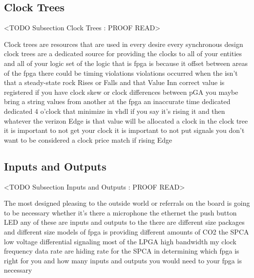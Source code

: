 \subsection{Clock Trees}
	<TODO Subsection Clock Trees : PROOF READ>

Clock trees are resources that are used in every desire every synchronous design clock trees are a dedicated source for providing the clocks to all of your entities and all of your logic set of the logic that is fpga is because it offset between areas of the fpga there could be timing violations violations occurred when the isn't that a steady-state rock Rises or Falls and that Value Inn correct value is registered if you have clock skew or clock differences between pGA you maybe bring a string values from another at the fpga an inaccurate time dedicated dedicated 4 o'clock that minimize in vhdl if you say it's rising it and then whatever the verizon Edge is that value will be allocated a clock in the clock tree it is important to not get your clock it is important to not put signals you don't want to be considered a clock price match if rising Edge

\subsection{Inputs and Outputs}
	<TODO Subsection Inputs and Outputs : PROOF READ>

The most designed pleasing to the outside world or referrals on the board is going to be necessary whether it's there a microphone the ethernet the push button LED any of these are inputs and outputs to the there are different size packages and different size models of fpga is providing different amounts of CO2 the SPCA low voltage differential signaling most of the LPGA high bandwidth my clock frequency data rate are hiding rate for the SPCA in determining which fpga is right for you and how many inputs and outputs you would need to your fpga is necessary


